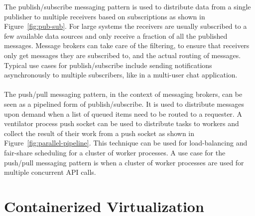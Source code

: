 \newpage
\noindent
The publish/subscribe messaging pattern is used to distribute data from a single publisher to multiple receivers based on subscriptions as shown in Figure~\ref{fig:pub-sub}. For large systems the receivers are usually subscribed to a few available data sources and only receive a fraction of all the published messages. Message brokers can take care of the filtering, to ensure that receivers only get messages they are subscribed to, and the actual routing of messages. Typical use cases for publish/subscribe include sending notifications asynchronously to multiple subscribers, like in a multi-user chat application.
\\ \\
The push/pull messaging pattern, in the context of messaging brokers, can be seen as a pipelined form of publish/subscribe. It is used to distribute messages upon demand when a list of queued items need to be routed to a requester. A ventilator process push socket can be used to distribute tasks to workers and collect the result of their work from a push socket as shown in Figure~\ref{fig:parallel-pipeline}. This technique can be used for load-balancing and fair-share scheduling for a cluster of worker processes. A use case for the push/pull messaging pattern is when a cluster of worker processes are used for multiple concurrent API calls.

\section{Containerized Virtualization}

